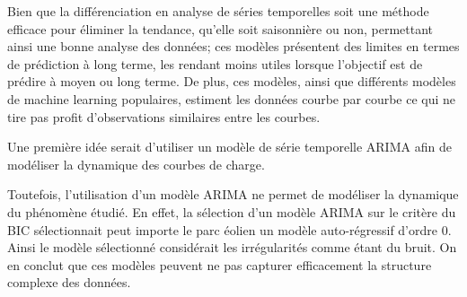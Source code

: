 Bien que la différenciation en analyse de séries temporelles soit une méthode efficace pour éliminer la tendance, qu'elle soit saisonnière ou non, permettant ainsi une bonne analyse des données; ces modèles présentent des limites en termes de prédiction à long terme, les rendant moins utiles lorsque l'objectif est de prédire à moyen ou long terme. De plus, ces modèles, ainsi que différents modèles de machine learning populaires, estiment les données courbe par courbe ce qui ne tire pas profit d'observations similaires entre les courbes.

\smallskip

Une première idée serait d'utiliser un modèle de série temporelle ARIMA afin de modéliser la dynamique des courbes de charge.





Toutefois, l'utilisation d'un modèle ARIMA ne permet de modéliser la dynamique du phénomène étudié. En effet, la sélection d'un modèle ARIMA sur le critère du BIC sélectionnait peut importe le parc éolien un modèle auto-régressif d'ordre 0. Ainsi le modèle sélectionné considérait les irrégularités comme étant du bruit. On en conclut que ces modèles peuvent ne pas capturer efficacement la structure complexe des données.